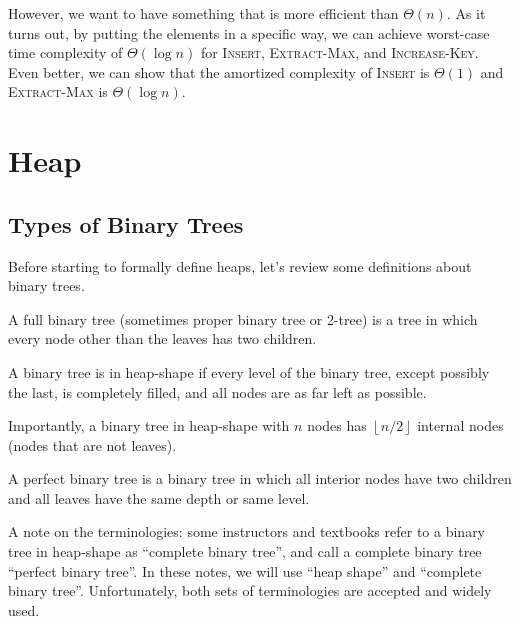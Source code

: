 However, we want to have something that is more efficient than $\Theta(n)$. As it turns out, by putting the elements in a specific way, we can achieve worst-case time complexity of $\Theta(\log n)$ for \textsc{Insert}, \textsc{Extract-Max}, and \textsc{Increase-Key}. Even better, we can show that the amortized complexity of \textsc{Insert} is $\Theta(1)$ and \textsc{Extract-Max} is $\Theta(\log n)$.

\section{Heap} 

\subsection{Types of Binary Trees}

Before starting to formally define heaps, let's review some definitions about binary trees. 

\begin{definition} 
    A full binary tree (sometimes proper binary tree or 2-tree) is a tree in which every node other than the leaves has two children. 
\end{definition}

\begin{definition}  
    A binary tree is in heap-shape if every level of the binary tree, except possibly the last, is completely filled, and all nodes are as far left as possible.

    Importantly, a binary tree in heap-shape with $n$ nodes has $\left\lfloor n / 2 \right\rfloor$ internal nodes (nodes that are not leaves).
\end{definition}

\begin{definition} 
    A perfect binary tree is a binary tree in which all interior nodes have two children and all leaves have the same depth or same level.
\end{definition}

A note on the terminologies: some instructors and textbooks refer to a binary tree in heap-shape as ``complete binary tree'', and call a complete binary tree ``perfect binary tree''. In these notes, we will use ``heap shape'' and ``complete binary tree''. Unfortunately, both sets of terminologies are accepted and widely used.

